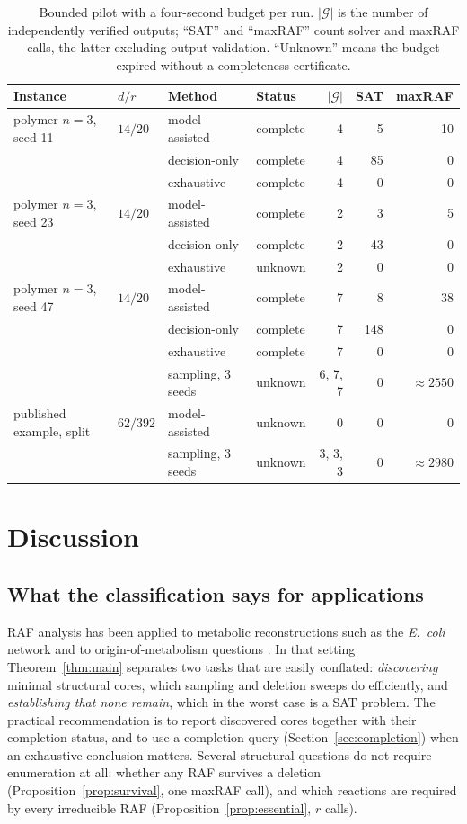 \documentclass[11pt,a4paper]{article}
\theoremstyle{plain}
\theoremstyle{definition}
\theoremstyle{remark}
\newcommand{\cG}{\mathcal G}
\begin{document}
\begin{table}[htbp]
\centering\small
\begin{tabular}{llllrrr}
\toprule
Instance & $d/r$ & Method & Status & $|\cG|$ & SAT & maxRAF\\
\midrule
polymer $n{=}3$, seed 11 & $14/20$ & model-assisted & complete & 4 & 5 & 10\\
 & & decision-only & complete & 4 & 85 & 0\\
 & & exhaustive & complete & 4 & 0 & 0\\
polymer $n{=}3$, seed 23 & $14/20$ & model-assisted & complete & 2 & 3 & 5\\
 & & decision-only & complete & 2 & 43 & 0\\
 & & exhaustive & unknown & 2 & 0 & 0\\
polymer $n{=}3$, seed 47 & $14/20$ & model-assisted & complete & 7 & 8 & 38\\
 & & decision-only & complete & 7 & 148 & 0\\
 & & exhaustive & complete & 7 & 0 & 0\\
 & & sampling, 3 seeds & unknown & 6, 7, 7 & 0 & $\approx2550$\\
published example, split & $62/392$ & model-assisted & unknown & 0 & 0 & 0\\
 & & sampling, 3 seeds & unknown & 3, 3, 3 & 0 & $\approx2980$\\
\bottomrule
\end{tabular}
\caption{Bounded pilot with a four-second budget per run. $|\cG|$ is the number of independently verified outputs; ``SAT'' and ``maxRAF'' count solver and maxRAF calls, the latter excluding output validation. ``Unknown'' means the budget expired without a completeness certificate.}
\label{tab:pilot}
\end{table}

\section{Discussion}\label{sec:discussion}

\subsection{What the classification says for applications}

RAF analysis has been applied to metabolic reconstructions such as the \emph{E.~coli} network \cite{sousa2015ecoli} and to origin-of-metabolism questions \cite{xavier2020autocatalytic}. In that setting Theorem~\ref{thm:main} separates two tasks that are easily conflated: \emph{discovering} minimal structural cores, which sampling and deletion sweeps do efficiently, and \emph{establishing that none remain}, which in the worst case is a SAT problem. The practical recommendation is to report discovered cores together with their completion status, and to use a completion query (Section~\ref{sec:completion}) when an exhaustive conclusion matters. Several structural questions do not require enumeration at all: whether any RAF survives a deletion (Proposition~\ref{prop:survival}, one maxRAF call), and which reactions are required by every irreducible RAF (Proposition~\ref{prop:essential}, $r$ calls).
\end{document}
